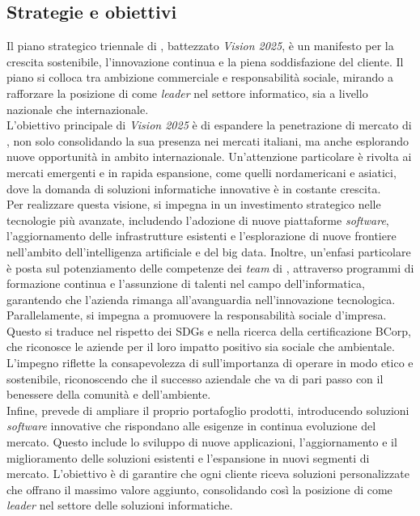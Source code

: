 \subsection{Strategie e obiettivi}
Il piano strategico triennale di \azienda{}, battezzato \textit{Vision 2025}, è un manifesto per la crescita sostenibile, l'innovazione continua e la piena 
soddisfazione del cliente. Il piano si colloca tra ambizione commerciale e responsabilità sociale, mirando a rafforzare la posizione 
di \azienda{} come \textit{leader}  nel settore informatico, sia a livello nazionale che internazionale. \\ 
L'obiettivo principale di \textit{Vision 2025} è di espandere la penetrazione di mercato di \azienda{}, non solo consolidando la sua presenza nei mercati italiani, 
ma anche esplorando nuove opportunità in ambito internazionale. Un'attenzione particolare è rivolta ai mercati emergenti e in rapida espansione, come quelli 
nordamericani e asiatici, dove la domanda di soluzioni informatiche innovative è in costante crescita. \\ 
Per realizzare questa visione, \azienda{} si impegna in un investimento strategico nelle tecnologie più avanzate,
includendo l'adozione di nuove piattaforme \textit{software}, l'aggiornamento delle infrastrutture esistenti e l'esplorazione 
di nuove frontiere nell'ambito dell'intelligenza artificiale e del big data. Inoltre, un'enfasi particolare è posta sul potenziamento delle competenze dei 
\textit{team} di \azienda{}, attraverso programmi di formazione continua e l'assunzione di talenti nel campo dell'informatica, garantendo che l'azienda rimanga 
all'avanguardia nell'innovazione tecnologica. \\ 
Parallelamente, \azienda{} si impegna a promuovere la responsabilità sociale d'impresa. 
Questo si traduce nel rispetto dei \gls{SDGs} e nella ricerca della certificazione \gls{BCorp}, che riconosce le aziende per il loro impatto positivo 
sia sociale che ambientale. L'impegno riflette la consapevolezza di \azienda{} sull'importanza di operare in modo etico e sostenibile, riconoscendo
 che il successo aziendale che va di pari passo con il benessere della comunità e dell'ambiente. \\ 
 Infine, \azienda{} prevede di ampliare il proprio portafoglio prodotti, introducendo soluzioni \textit{software} innovative che rispondano alle esigenze in continua evoluzione del mercato. 
 Questo include lo sviluppo di nuove applicazioni, l'aggiornamento e il miglioramento delle soluzioni esistenti e l'espansione in nuovi segmenti di mercato. 
 L'obiettivo è di garantire che ogni cliente riceva soluzioni personalizzate che offrano il massimo valore aggiunto, 
 consolidando così la posizione di \azienda{} come \textit{leader}  nel settore delle soluzioni informatiche.

